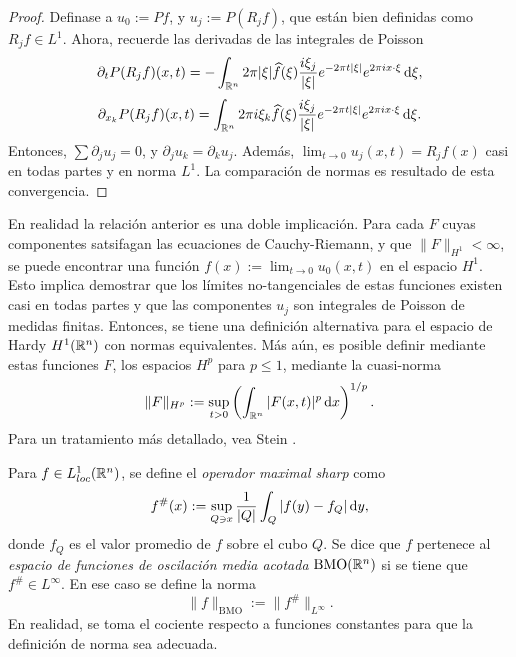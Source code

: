 \begin{proof}
	 Definase a $u_0 := Pf$, y $u_j := P(R_jf)$, que están bien definidas como $R_jf\in L^1$. Ahora, recuerde las derivadas de las integrales de Poisson
			\begin{equation*}
		\partial_t P(R_jf)(x, t) = - \int_{\mathbb{R}^n} 2\pi|\xi| \widehat{f}(\xi) \frac{i\xi_j}{|\xi|}e^{-2\pi t |\xi|} e^{2\pi ix \cdot \xi} \mathop{}\!\mathrm{d} \xi,
	\end{equation*}
	\begin{equation*}
		\partial_{x_k} P(R_jf)(x, t) = \int_{\mathbb{R}^n} 2\pi i\xi_k\widehat{f}(\xi) \frac{i\xi_j}{|\xi|}e^{-2\pi t |\xi|} e^{2\pi ix \cdot \xi} \mathop{}\!\mathrm{d} \xi.
	\end{equation*}
	Entonces, $\sum \partial_j u_j = 0$, y $\partial_j u_k = \partial_k u_j$. Además, $\lim_{t\to0}u_j(x, t) = R_jf(x)$ casi en todas partes y en norma $L^1$. La comparación de normas es resultado de esta convergencia.
\end{proof}
\begin{remark}
	En realidad la relación anterior es una doble implicación. Para cada $F$ cuyas componentes satsifagan las ecuaciones de Cauchy-Riemann, y que $\|F\|_{H^1}<\infty$, se puede encontrar una función $f(x):= \lim_{t\to0}u_0(x, t)$ en el espacio $H^1$. Esto implica demostrar que los límites no-tangenciales de estas funciones existen casi en todas partes y que las componentes $u_j$ son integrales de Poisson de medidas finitas. Entonces, se tiene una definición alternativa para el espacio de Hardy $H^1(\mathbb{R}^n)$ con normas equivalentes. Más aún, es posible definir mediante estas funciones $F$, los espacios $H^p$ para $p\leq1$, mediante la cuasi-norma
	\begin{equation*}
		\|F\|_{H^p} := \sup_{t>0} \left(\int_{\mathbb{R}^n} |F(x, t)|^p \mathop{}\!\mathrm{d} x\right)^{1/p}.
	\end{equation*}
	Para un tratamiento más detallado, vea Stein \cite{stein-singular}.
\end{remark}
\begin{definition}
	Para $f\in L^1_{loc}(\mathbb{R}^n)$, se define el \textit{operador maximal sharp} como
	\begin{equation*}
		f^\#(x) := \sup_{Q\ni x} \frac{1}{|Q|}\int_Q |f(y)-f_Q| \mathop{}\!\mathrm{d} y,
	\end{equation*}
	donde $f_Q$ es el valor promedio de $f$ sobre el cubo $Q$. Se dice que $f$ pertenece al \textit{espacio de funciones de oscilación media acotada} $\mathrm{BMO}(\mathbb{R}^n)$ si se tiene que $f^\# \in{L^\infty}$. En ese caso se define la norma
	\begin{equation*}
		\|f\|_{\mathrm{BMO}} := \| f^\#\|_{L^\infty}.
	\end{equation*}
	En realidad, se toma el cociente respecto a funciones constantes para que la definición de norma sea adecuada.
\end{definition}
